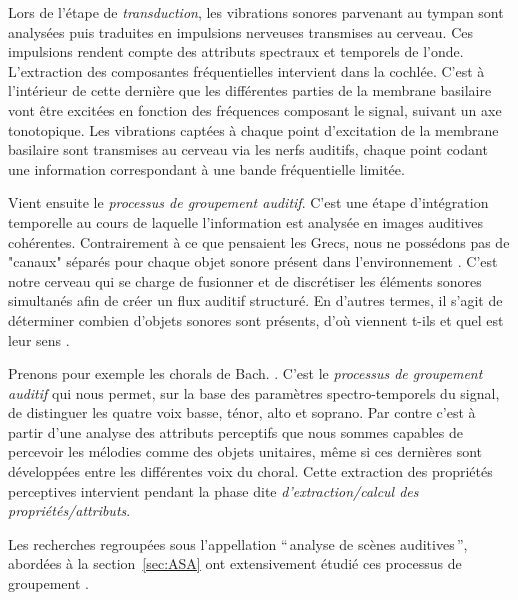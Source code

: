 Lors de l'étape de \emph{transduction}, les vibrations sonores parvenant au tympan sont analysées puis traduites en impulsions nerveuses transmises au cerveau. Ces impulsions rendent compte des attributs spectraux et temporels de l'onde. L'extraction des composantes fréquentielles intervient dans la cochlée. C'est à l'intérieur de cette dernière que les différentes parties de la membrane basilaire vont être excitées en fonction des fréquences composant le signal, suivant un axe tonotopique. Les vibrations captées à chaque point d’excitation de la membrane basilaire sont transmises au cerveau via les nerfs auditifs, chaque point codant une information correspondant à une bande fréquentielle limitée. 

Vient ensuite le \emph{processus de groupement auditif}. C'est une étape d'intégration temporelle au cours de laquelle l'information est analysée en images auditives cohérentes. Contrairement à ce que pensaient les Grecs, nous ne possédons pas de "canaux" séparés pour chaque objet sonore présent dans l'environnement \citep{yost1994fundamentals}. C'est notre cerveau qui se charge de fusionner et de discrétiser les éléments sonores simultanés afin de créer un flux auditif structuré. En d'autres termes, il s'agit de déterminer combien d'objets sonores sont présents, d'où viennent t-ils et quel est leur sens . 


Prenons pour exemple les chorals de Bach. . C'est le \emph{processus de groupement auditif} qui nous permet, sur la base des paramètres spectro-temporels du signal, de distinguer les quatre voix basse, ténor, alto et soprano. Par contre c'est à partir d'une analyse des attributs perceptifs que nous sommes capables de percevoir les mélodies comme des objets unitaires, même si ces dernières sont développées entre les différentes voix du choral. Cette extraction des propriétés perceptives intervient pendant la phase dite \emph{d'extraction/calcul des propriétés/attributs}.

Les recherches regroupées sous l'appellation ``\,analyse de scènes auditives\,'', abordées à la section~\ref{sec:ASA} ont  extensivement étudié ces processus de groupement .

